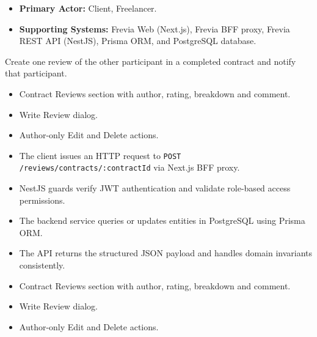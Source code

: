 
\begin{itemize}[leftmargin=1.6em,topsep=3pt,itemsep=2pt,parsep=0pt,label=$\bullet$]
    \item \textbf{Primary Actor:} Client, Freelancer.
    \item \textbf{Supporting Systems:} Frevia Web (Next.js), Frevia BFF proxy, Frevia REST API (NestJS), Prisma ORM, and PostgreSQL database.
\end{itemize}

\noindent Create one review of the other participant in a completed contract and notify that participant.

\begin{itemize}[leftmargin=1.6em,topsep=3pt,itemsep=2pt,parsep=0pt,label=$\bullet$]
    \item Contract Reviews section with author, rating, breakdown and comment.
    \item Write Review dialog.
    \item Author-only Edit and Delete actions.
\end{itemize}

\begin{itemize}[leftmargin=1.6em,topsep=3pt,itemsep=2pt,parsep=0pt,label=$\bullet$]
    \item The client issues an HTTP request to \texttt{POST /\allowbreak{}reviews/\allowbreak{}contracts/\allowbreak{}:\allowbreak{}contractId} via Next.js BFF proxy.
    \item NestJS guards verify JWT authentication and validate role-based access permissions.
    \item The backend service queries or updates entities in PostgreSQL using Prisma ORM.
    \item The API returns the structured JSON payload and handles domain invariants consistently.
\end{itemize}

\begin{itemize}[leftmargin=1.6em,topsep=3pt,itemsep=2pt,parsep=0pt,label=$\bullet$]
    \item Contract Reviews section with author, rating, breakdown and comment.
    \item Write Review dialog.
    \item Author-only Edit and Delete actions.
\end{itemize}

